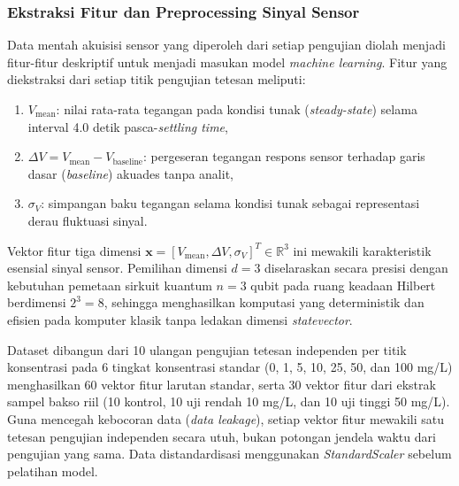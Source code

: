 \subsubsection{Ekstraksi Fitur dan Preprocessing Sinyal Sensor}
\label{subsec:feature_extraction}
Data mentah akuisisi sensor yang diperoleh dari setiap pengujian diolah menjadi fitur-fitur deskriptif untuk menjadi masukan model \textit{machine learning}. Fitur yang diekstraksi dari setiap titik pengujian tetesan meliputi:
\begin{enumerate}
    \item $V_{\text{mean}}$: nilai rata-rata tegangan pada kondisi tunak (\textit{steady-state}) selama interval 4.0 detik pasca-\textit{settling time},
    \item $\Delta V = V_{\text{mean}} - V_{\text{baseline}}$: pergeseran tegangan respons sensor terhadap garis dasar (\textit{baseline}) akuades tanpa analit,
    \item $\sigma_V$: simpangan baku tegangan selama kondisi tunak sebagai representasi derau fluktuasi sinyal.
\end{enumerate}
Vektor fitur tiga dimensi $\mathbf{x} = [V_{\text{mean}}, \Delta V, \sigma_V]^T \in \mathbb{R}^3$ ini mewakili karakteristik esensial sinyal sensor. Pemilihan dimensi $d=3$ diselaraskan secara presisi dengan kebutuhan pemetaan sirkuit kuantum $n=3$ qubit pada ruang keadaan Hilbert berdimensi $2^3 = 8$, sehingga menghasilkan komputasi yang deterministik dan efisien pada komputer klasik tanpa ledakan dimensi \textit{statevector}.

Dataset dibangun dari 10 ulangan pengujian tetesan independen per titik konsentrasi pada 6 tingkat konsentrasi standar (0, 1, 5, 10, 25, 50, dan 100 mg/L) menghasilkan 60 vektor fitur larutan standar, serta 30 vektor fitur dari ekstrak sampel bakso riil (10 kontrol, 10 uji rendah 10 mg/L, dan 10 uji tinggi 50 mg/L). Guna mencegah kebocoran data (\textit{data leakage}), setiap vektor fitur mewakili satu tetesan pengujian independen secara utuh, bukan potongan jendela waktu dari pengujian yang sama. Data distandardisasi menggunakan \textit{StandardScaler} sebelum pelatihan model.


